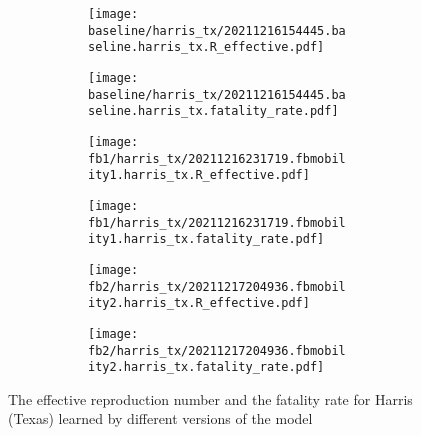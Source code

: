 \begin{figure}[!htb]
    \centering

    \begin{subfigure}[b]{\linewidth}
        \centering
        \begin{subfigure}[b]{0.4\linewidth}
            \texttt{[image: baseline/harris\_tx/20211216154445.baseline.harris\_tx.R\_effective.pdf]}
        \end{subfigure}
        \begin{subfigure}[b]{0.4\linewidth}
            \texttt{[image: baseline/harris\_tx/20211216154445.baseline.harris\_tx.fatality\_rate.pdf]}
        \end{subfigure}
    \end{subfigure}

    \begin{subfigure}[b]{\linewidth}
        \centering
        \begin{subfigure}[b]{0.4\linewidth}
            \texttt{[image: fb1/harris\_tx/20211216231719.fbmobility1.harris\_tx.R\_effective.pdf]}
        \end{subfigure}
        \begin{subfigure}[b]{0.4\linewidth}
            \texttt{[image: fb1/harris\_tx/20211216231719.fbmobility1.harris\_tx.fatality\_rate.pdf]}
        \end{subfigure}
    \end{subfigure}

    \begin{subfigure}[b]{\linewidth}
        \centering
        \begin{subfigure}[b]{0.4\linewidth}
            \texttt{[image: fb2/harris\_tx/20211217204936.fbmobility2.harris\_tx.R\_effective.pdf]}
        \end{subfigure}
        \begin{subfigure}[b]{0.4\linewidth}
            \texttt{[image: fb2/harris\_tx/20211217204936.fbmobility2.harris\_tx.fatality\_rate.pdf]}
        \end{subfigure}
    \end{subfigure}

    \caption{The effective reproduction number and the fatality rate for Harris (Texas) learned by different versions of the model}
    \label{fig:R0-and-fatality-harris}
\end{figure}

